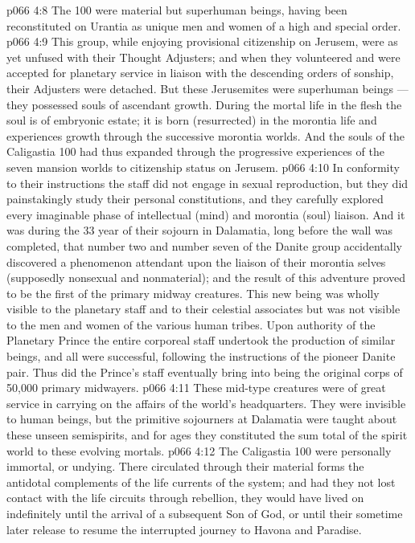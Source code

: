 \vs p066 4:8 \bibnobreakspace The 100 were material but superhuman beings, having been reconstituted on Urantia as unique men and women of a high and special order.
\vs p066 4:9 This group, while enjoying provisional citizenship on Jerusem, were as yet unfused with their Thought Adjusters; and when they volunteered and were accepted for planetary service in liaison with the descending orders of sonship, their Adjusters were detached. But these Jerusemites were superhuman beings --- they possessed souls of ascendant growth. During the mortal life in the flesh the soul is of embryonic estate; it is born (resurrected) in the morontia life and experiences growth through the successive morontia worlds. And the souls of the Caligastia 100 had thus expanded through the progressive experiences of the seven mansion worlds to citizenship status on Jerusem.
\vs p066 4:10 In conformity to their instructions the staff did not engage in sexual reproduction, but they did painstakingly study their personal constitutions, and they carefully explored every imaginable phase of intellectual (mind) and morontia (soul) liaison. And it was during the 33 year of their sojourn in Dalamatia, long before the wall was completed, that number two and number seven of the Danite group accidentally discovered a phenomenon attendant upon the liaison of their morontia selves (supposedly nonsexual and nonmaterial); and the result of this adventure proved to be the first of the primary midway creatures. This new being was wholly visible to the planetary staff and to their celestial associates but was not visible to the men and women of the various human tribes. Upon authority of the Planetary Prince the entire corporeal staff undertook the production of similar beings, and all were successful, following the instructions of the pioneer Danite pair. Thus did the Prince’s staff eventually bring into being the original corps of 50,000 primary midwayers.
\vs p066 4:11 These mid\hyp{}type creatures were of great service in carrying on the affairs of the world’s headquarters. They were invisible to human beings, but the primitive sojourners at Dalamatia were taught about these unseen semispirits, and for ages they constituted the sum total of the spirit world to these evolving mortals.
\vs p066 4:12 \bibnobreakspace The Caligastia 100 were personally immortal, or undying. There circulated through their material forms the antidotal complements of the life currents of the system; and had they not lost contact with the life circuits through rebellion, they would have lived on indefinitely until the arrival of a subsequent Son of God, or until their sometime later release to resume the interrupted journey to Havona and Paradise.
